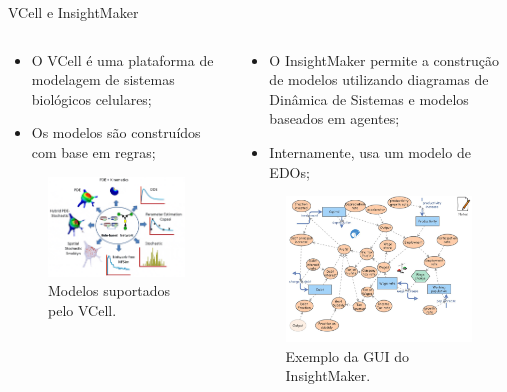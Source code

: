\begin{frame}{VCell e InsightMaker}

    \begin{columns}
        \begin{column}{.5\textwidth}
            \begin{itemize}
                \item O VCell é uma plataforma de modelagem de sistemas biológicos celulares;
                \item Os modelos são construídos com base em regras;
            \end{itemize}

            \begin{figure}
                \centering
                \includegraphics[width=.60\textwidth]{beamerthemesrc/images/vcell.png}
                \caption{Modelos suportados pelo VCell.}
            \end{figure}
        \end{column}

        \begin{column}{.5\textwidth}
            \begin{itemize}
                \item O InsightMaker permite a construção de modelos utilizando diagramas de Dinâmica de Sistemas e modelos baseados em agentes;
                \item Internamente, usa um modelo de EDOs;
            \end{itemize}

            \begin{figure}
                \centering
                \includegraphics[width=.55\textwidth]{beamerthemesrc/images/insight-maker.png}
                \caption{Exemplo da GUI do InsightMaker.}
            \end{figure}
        \end{column}
    \end{columns}
\end{frame}
